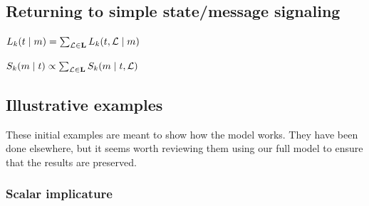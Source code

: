 \documentclass{article}
\begin{document}

\subsection{Returning to simple state/message signaling}

\begin{examples}
\item\label{lisnorm} $L_{k}(t \mid m)  = \sum_{\mathcal{L} \in \mathbf{L}} L_{k}(t, \mathcal{L} \mid m)$
\item\label{spknorm} $S_{k}(m \mid t) \propto \sum_{\mathcal{L} \in \mathbf{L}} S_{k}(m \mid t, \mathcal{L})$
\end{examples}


\subsection{Illustrative examples}\label{sec:illustrations}

\begin{examples}
\item These initial examples are meant to show how the model works.
  They have been done elsewhere, but it seems worth reviewing them
  using our full model to ensure that the results are preserved.

\end{examples}


\subsubsection{Scalar implicature}\label{sec:scalar}

\newcommand{\scalarstate}[1]{w_{#1}}
\newcommand{\wALL}{\scalarstate{\forall}}
\newcommand{\wSOMENOTALL}{\scalarstate{\exists\neg\forall}}

\newcommand{\scalarmsg}[1]{\text{#1}}
\newcommand{\mAll}{\scalarmsg{all}}
\newcommand{\mSome}{\scalarmsg{some}}
\newcommand{\mSomevAll}{\scalarmsg{some or all}}
\end{document}
